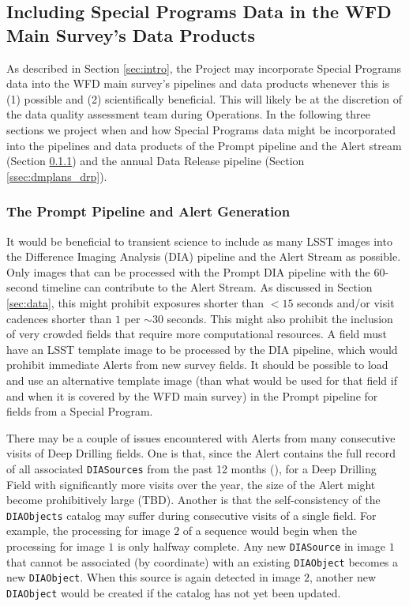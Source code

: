 \documentclass[DM,lsstdoc,toc]{lsstdoc}
\begin{document}
\subsection{Including Special Programs Data in the WFD Main Survey's Data Products}\label{ssec:dmplans_WFD}

As described in Section \ref{sec:intro}, the Project may incorporate Special Programs data into the WFD main survey's pipelines and data products whenever this is (1) possible and (2) scientifically beneficial. This will likely be at the discretion of the data quality assessment team during Operations. In the following three sections we project when and how Special Programs data might be incorporated into the pipelines and data products of the Prompt pipeline and the Alert stream (Section \ref{ssec:dmplans_prompt}) and the annual Data Release pipeline (Section \ref{ssec:dmplans_drp}).

\subsubsection{The Prompt Pipeline and Alert Generation}\label{ssec:dmplans_prompt}

It would be beneficial to transient science to include as many LSST images into the Difference Imaging Analysis (DIA) pipeline and the Alert Stream as possible. Only images that can be processed with the Prompt DIA pipeline with the $60$-second timeline can contribute to the Alert Stream. As discussed in Section \ref{sec:data}, this might prohibit exposures shorter than $<15$ seconds and/or visit cadences shorter than $1$ per $\sim30$ seconds. This might also prohibit the inclusion of very crowded fields that require more computational resources. A field must have an LSST template image to be processed by the DIA pipeline, which would prohibit immediate Alerts from new survey fields. It should be possible to load and use an alternative template image (than what would be used for that field if and when it is covered by the WFD main survey) in the Prompt pipeline for fields from a Special Program. 

There may be a couple of issues encountered with Alerts from many consecutive visits of Deep Drilling fields. One is that, since the Alert contains the full record of all associated {\tt DIASources} from the past 12 months (), for a Deep Drilling Field with significantly more visits over the year, the size of the Alert might become prohibitively large (TBD). Another is that the self-consistency of the \texttt{DIAObjects} catalog may suffer during consecutive visits of a single field. For example, the processing for image $2$ of a sequence would begin when the processing for image $1$ is only halfway complete. Any new {\tt DIASource} in image $1$ that cannot be associated (by coordinate) with an existing {\tt DIAObject} becomes a new {\tt DIAObject}. When this source is again detected in image $2$, another new {\tt DIAObject} would be created if the catalog has not yet been updated.
\end{document}
